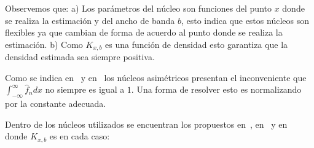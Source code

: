 Observemos que: a) Los parámetros del núcleo son funciones del punto $x$ donde se realiza la estimación y del ancho de banda $b$, esto indica que estos núcleos son flexibles ya que cambian de forma de acuerdo al punto donde se realiza la estimación.
b) Como $K_{x,b}$ es una función de densidad esto garantiza que la densidad estimada sea siempre positiva. 

Como se indica en~\citet{Libnegue2013} y en~\citet{Hirukawa2018} los núcleos asimétricos presentan el inconveniente que $\int_{-\infty}^{\infty} \widehat{f}_n dx$ no siempre es igual a $1$. Una forma de resolver esto es normalizando por la constante adecuada.

Dentro de los núcleos utilizados se encuentran los propuestos en~\citet{chensx2000}, en~\citet{Libnegue2013} y en~\citet{bouezmarni2005} donde $K_{x,b}$ es en cada caso: 


